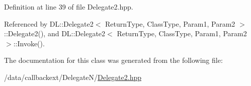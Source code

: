 Definition at line 39 of file Delegate2.hpp.

Referenced by DL::Delegate2$<$ Return\-Type, Class\-Type, Param1, Param2 $>$::Delegate2(), and DL::Delegate2$<$ Return\-Type, Class\-Type, Param1, Param2 $>$::Invoke().

The documentation for this class was generated from the following file:\begin{CompactItemize}
\item 
/data/callbackext/Delegate\-N/\hyperlink{Delegate2_8hpp}{Delegate2.hpp}\end{CompactItemize}
